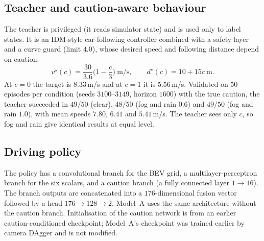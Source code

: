 \documentclass[conference]{IEEEtran}
\begin{document}
\subsection{Teacher and caution-aware behaviour}
The teacher is privileged (it reads simulator state) and is used only to label states. It is an IDM-style car-following controller combined with a safety layer and a curve guard (limit $4.0$), whose desired speed and following distance depend on caution:
\begin{equation}
v^\star(c)=\frac{30}{3.6}\Big(1-\frac{c}{3}\Big)\ \text{m/s},\qquad d^\star(c)=10+15c\ \text{m}.
\label{eq:teacher}
\end{equation}
At $c=0$ the target is $8.33$\,m/s and at $c=1$ it is $5.56$\,m/s. Validated on $50$ episodes per condition (seeds $3100$--$3149$, horizon $1600$) with the true caution, the teacher succeeded in $49/50$ (clear), $48/50$ (fog and rain $0.6$) and $49/50$ (fog and rain $1.0$), with mean speeds $7.80$, $6.41$ and $5.41$\,m/s. The teacher sees only $c$, so fog and rain give identical results at equal level.

\subsection{Driving policy}
The policy has a convolutional branch for the BEV grid, a multilayer-perceptron branch for the six scalars, and a caution branch (a fully connected layer $1\to16$). The branch outputs are concatenated into a $176$-dimensional fusion vector followed by a head $176\to128\to2$. Model~A uses the same architecture without the caution branch. Initialisation of the caution network is from an earlier caution-conditioned checkpoint; Model~A's checkpoint was trained earlier by camera DAgger and is not modified.
\end{document}
